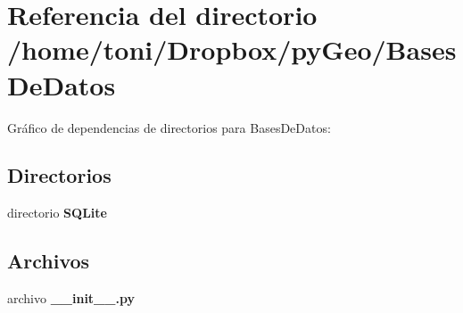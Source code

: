 \section{Referencia del directorio /home/toni/\-Dropbox/py\-Geo/\-Bases\-De\-Datos}
\label{dir_d1f7c693b0d68a89043c4a936e56d15c}
Gráfico de dependencias de directorios para Bases\-De\-Datos\-:
\subsection*{Directorios}
\begin{DoxyCompactItemize}
\item 
directorio {\bf S\-Q\-Lite}
\end{DoxyCompactItemize}
\subsection*{Archivos}
\begin{DoxyCompactItemize}
\item 
archivo {\bf \-\_\-\-\_\-init\-\_\-\-\_\-.\-py}
\end{DoxyCompactItemize}
